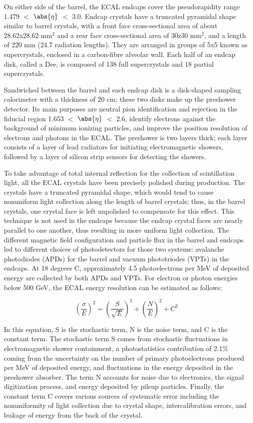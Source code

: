 On either side of the barrel, the ECAL endcaps cover the pseudorapidity range 1.479 $<$ $\abs{\eta}$ $<$ 3.0. Endcap crystals have a truncated pyramidal shape similar to barrel crystals, with a front face cross-sectional area of about 28.62x28.62 mm$^2$ and a rear face cross-sectional area of 30z30 mm$^2$, and a length of 220 mm (24.7 radiation lengths). They are arranged in groups of 5x5 known as supercrystals, enclosed in a carbon-fibre alveolar wall. Each half of an endcap disk, called a Dee, is composed of 138 full supercrystals and 18 partial supercrystals.

Sandwiched between the barrel and each endcap disk is a disk-shaped sampling calorimeter with a thickness of 20 cm; these two disks make up the preshower detector. Its main purposes are neutral pion identification and rejection in the fiducial region 1.653 $<$ $\abs{\eta}$ $<$ 2.6, identify electrons against the background of minimum ionizing particles, and improve the position resolution of electrons and photons in the ECAL. The preshower is two layers thick; each layer consists of a layer of lead radiators for initiating electromagnetic showers, followed by a layer of silicon strip sensors for detecting the showers.

To take advantage of total internal reflection for the collection of scintillation light, all the ECAL crystals have been precisely polished during production. The crystals have a truncated pyramidal shape, which would tend to cause nonuniform light collection along the length of barrel crystals; thus, in the barrel crystals, one crystal face is left unpolished to compensate for this effect. This technique is not used in the endcaps because the endcap crystal faces are nearly parallel to one another, thus resulting in more uniform light collection. The different magnetic field configuration and particle flux in the barrel and endcaps led to different choices of photodetectors for those two systems: avalanche photodiodes (APDs) for the barrel and vacuum phototriodes (VPTs) in the endcaps. At 18 degrees C, approximately 4.5 photoelectrons per MeV of deposited energy are collected by both APDs and VPTs. For electron or photon energies below 500 GeV, the ECAL energy resolution can be estimated as follows:

\begin{equation}
(\frac{\sigma}{E})^2 = (\frac{S}{\sqrt{E}})^2 + (\frac{N}{E})^2 + C^2
\end{equation}

In this equation, S is the stochastic term, N is the noise term, and C is the constant term. The stochastic term S comes from stochastic fluctuations in electromagnetic shower containment, a photostatistics contribution of 2.1\% coming from the uncertainty on the number of primary photoelectrons produced per MeV of deposited energy, and fluctuations in the energy deposited in the preshower absorber. The term N accounts for noise due to electronics, the signal digitization process, and energy deposited by pileup particles. Finally, the constant term C covers various sources of systematic error including the nonuniformity of light collection due to crystal shape, intercalibration errors, and leakage of energy from the back of the crystal.

